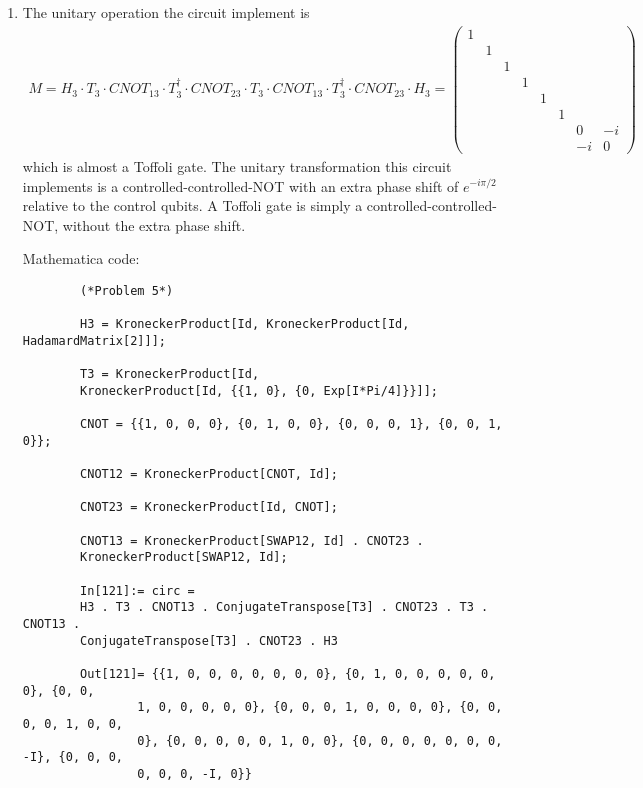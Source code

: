 \documentclass{article}
\theoremstyle{definition}
\begin{document}
\begin{enumerate}[label=(\alph*)]
	\item The unitary operation the circuit implement is 
	\begin{align*}
		M 
		= H_3 \cdot  T_3 \cdot  CNOT_{13} \cdot T_3^\dagger \cdot CNOT_{23} \cdot T_3 \cdot CNOT_{13} \cdot T_3^\dagger \cdot CNOT_{23} \cdot H_3 
		= \begin{pmatrix}
			1&&&&&&& \\
			&1&&&&&& \\
			&&1&&&&& \\
			&&&1&&&& \\
			&&&&1&&& \\
			&&&&&1&& \\
			&&&&&&0&-i \\
			&&&&&&-i&0 
		\end{pmatrix}
	\end{align*}
	which is almost a Toffoli gate. The unitary transformation this circuit implements is a controlled-controlled-NOT with an extra phase shift of $e^{-i\pi/2}$ relative to the control qubits. A Toffoli gate is simply a controlled-controlled-NOT, without the extra phase shift. 

	Mathematica code:
	\begin{lstlisting}
		(*Problem 5*)
		
		H3 = KroneckerProduct[Id, KroneckerProduct[Id, HadamardMatrix[2]]];
		
		T3 = KroneckerProduct[Id, 
		KroneckerProduct[Id, {{1, 0}, {0, Exp[I*Pi/4]}}]];
		
		CNOT = {{1, 0, 0, 0}, {0, 1, 0, 0}, {0, 0, 0, 1}, {0, 0, 1, 0}};
		
		CNOT12 = KroneckerProduct[CNOT, Id];
		
		CNOT23 = KroneckerProduct[Id, CNOT];
		
		CNOT13 = KroneckerProduct[SWAP12, Id] . CNOT23 . 
		KroneckerProduct[SWAP12, Id];
		
		In[121]:= circ = 
		H3 . T3 . CNOT13 . ConjugateTranspose[T3] . CNOT23 . T3 . CNOT13 . 
		ConjugateTranspose[T3] . CNOT23 . H3
		
		Out[121]= {{1, 0, 0, 0, 0, 0, 0, 0}, {0, 1, 0, 0, 0, 0, 0, 0}, {0, 0, 
				1, 0, 0, 0, 0, 0}, {0, 0, 0, 1, 0, 0, 0, 0}, {0, 0, 0, 0, 1, 0, 0, 
				0}, {0, 0, 0, 0, 0, 1, 0, 0}, {0, 0, 0, 0, 0, 0, 0, -I}, {0, 0, 0, 
				0, 0, 0, -I, 0}}
	\end{lstlisting}


\end{enumerate}
\end{document}
